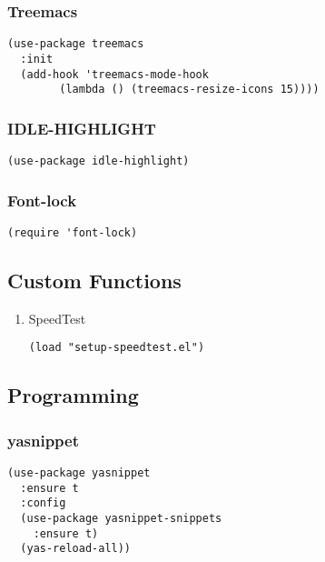 \documentclass[11pt]{article}
\begin{document}
\subsubsection{Treemacs}
\label{sec:org82a364a}
\begin{verbatim}
(use-package treemacs 
  :init
  (add-hook 'treemacs-mode-hook
	    (lambda () (treemacs-resize-icons 15))))

\end{verbatim}

\subsubsection{IDLE-HIGHLIGHT}
\label{sec:org16a17ec}

\begin{verbatim}
(use-package idle-highlight)
\end{verbatim}

\subsubsection{Font-lock}
\label{sec:orge1a1db0}
\begin{verbatim}
(require 'font-lock)
\end{verbatim}

\subsection{Custom Functions}
\label{sec:org87ceb95}
\begin{enumerate}
\item SpeedTest
\label{sec:orgdaf9ef5}
\begin{verbatim}
(load "setup-speedtest.el")
\end{verbatim}
\end{enumerate}


\subsection{Programming}
\label{sec:org71f93f9}
\subsubsection{yasnippet}
\label{sec:org475a28a}
\begin{verbatim}
(use-package yasnippet
  :ensure t
  :config
  (use-package yasnippet-snippets
    :ensure t)
  (yas-reload-all))
\end{verbatim}
\end{document}
